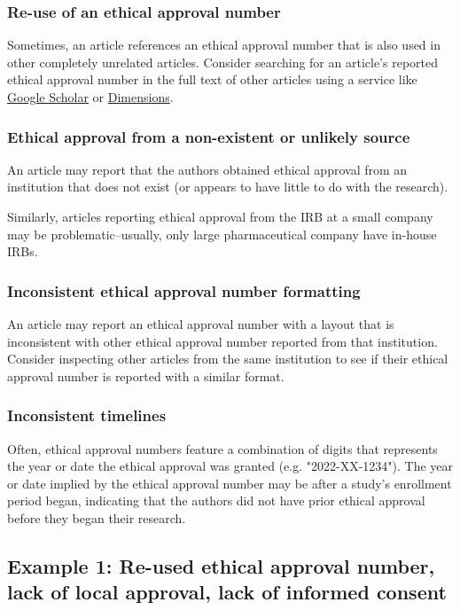 \documentclass[letterpaper, 12pt]{article}
\begin{document}
\subsubsection*{Re-use of an ethical approval number}

Sometimes, an article references an ethical approval number that is also used in other completely unrelated articles. Consider searching for an article's reported ethical approval number in the full text of other articles using a service like \href{https://scholar.google.com}{Google Scholar} or \href{https://www.dimensions.ai/}{Dimensions}.

\subsubsection*{Ethical approval from a non-existent or unlikely source}

An article may report that the authors obtained ethical approval from an institution that does not exist (or appears to have little to do with the research).

Similarly, articles reporting ethical approval from the IRB at a small company may be problematic--usually, only large pharmaceutical company have in-house IRBs.

\subsubsection*{Inconsistent ethical approval number formatting}

An article may report an ethical approval number with a layout that is inconsistent with other ethical approval number reported from that institution. Consider inspecting other articles from the same institution to see if their ethical approval number is reported with a similar format.

\subsubsection*{Inconsistent timelines}

Often, ethical approval numbers feature a combination of digits that represents the year or date the ethical approval was granted (e.g. "2022-XX-1234"). The year or date implied by the ethical approval number may be after a study's enrollment period began, indicating that the authors did not have prior ethical approval before they began their research.

\subsection*{Example 1: Re-used ethical approval number, lack of local approval, lack of informed consent}
\end{document}
